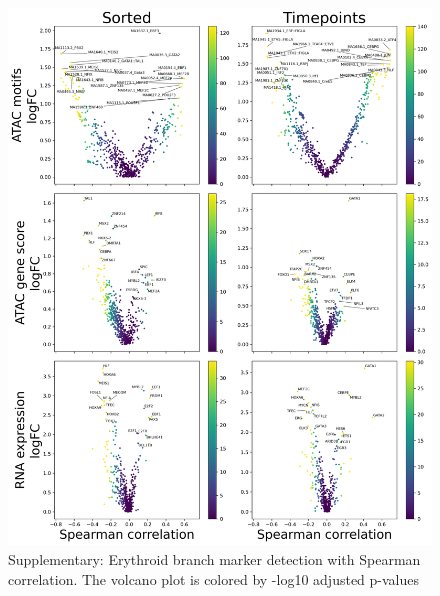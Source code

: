 \documentclass[a4paper]{article}
\begin{document}
\begin{figure}[!htb]
  \centering
  \includegraphics[width=\textwidth]{../figures/hematopoiesis/Basophil_40_109_smooth_none_single_branch_volcanos_motifs.png}
  \caption{Supplementary: Erythroid branch marker detection with Spearman correlation. The volcano plot is colored by -log10 adjusted p-values}
\end{figure}
\end{document}
